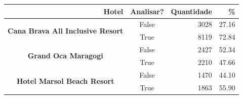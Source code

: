 \begin{table}[h]
	\centering
	\begin{tabular}{|c|c|r|r|}
		\hline
		\multicolumn{1}{|r|}{\textbf{Hotel}}                                    &
		\multicolumn{1}{r|}{\textbf{Analisar?}}                                 &
		\textbf{Quantidade}                                                     &
		\textbf{\%}                                                               \\ \hline
		\multirow{2}{*}{\textbf{Cana Brava All Inclusive Resort}}               &
		False                                                                   &
		3028                                                                    &
		27.16                                                                     \\ \cline{2-4}
		                                                                        &
		True                                                                    &
		8119                                                                    &
		72.84                                                                     \\ \hline
		\multirow{2}{*}{\textbf{Grand Oca Maragogi}}                            &
		False                                                                   &
		2427                                                                    &
		52.34                                                                     \\ \cline{2-4}
		                                                                        &
		True                                                                    &
		2210                                                                    &
		47.66                                                                     \\ \hline
		\multirow{2}{*}{\textbf{Hotel Marsol Beach Resort}}                     &
		False                                                                   &
		1470                                                                    &
		44.10                                                                     \\ \cline{2-4}
		                                                                        &
		True                                                                    &
		1863                                                                    &
		55.90                                                                     \\ \hline

\end{tabular}
\end{table}
